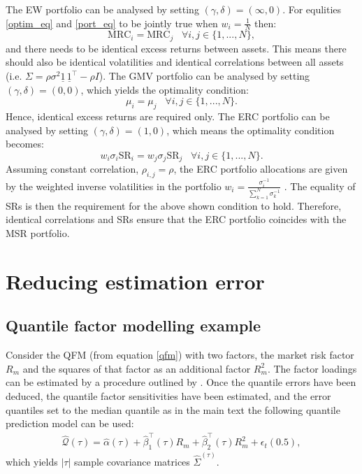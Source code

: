 \documentclass[a4paper,11pt,nocenter,bold,noupper,headcount]{mythesis}
\theoremstyle{plain}
\theoremstyle{definition}
\begin{document}
The EW portfolio can be analysed by setting $(\gamma, \delta) = (\infty, 0)$. For equlities \ref{optim_eq} and \ref{port_eq} to be jointly true when $w_i = \frac{1}{N}$ then: $$\text{MRC}_i = \text{MRC}_j \;\;\; \forall i, j \in \{1, ..., N \},$$
and there needs to be identical excess returns between assets. This means there should also be identical volatilities and identical correlations between all assets (i.e. $\Sigma = \rho\sigma^2 \underline{1} \,\underline{1}^\intercal - \rho I$). The GMV portfolio can be analysed by setting $(\gamma, \delta) = (0,0)$, which yields the optimality condition: $$\mu_i = \mu_j \;\;\; \forall i, j \in \{1, ..., N \}.$$
Hence, identical excess returns are required only. The ERC portfolio can be analysed by setting $(\gamma, \delta) = (1, 0)$, which  means the optimality condition becomes:
$$w_i \sigma_i \text{SR}_i = w_j \sigma_j \text{SR}_j \;\;\; \forall i, j \in \{1, ..., N \}.$$
Assuming constant correlation, $\rho_{i, j} = \rho$, the ERC portfolio allocations are given by the weighted inverse volatilities in the portfolio $w_i = \frac{\sigma^{-1}_i}{\sum_{k = 1}^N \sigma^{-1}_k}$ \citep{MRT10}. The equality of SRs is then the requirement for the above shown condition to hold. Therefore, identical correlations and SRs  ensure that the ERC portfolio coincides with the MSR portfolio.

\chapter{Reducing estimation error} 


\section{Quantile factor modelling example} \label{qfm_e}

Consider the QFM (from equation \ref{qfm}) with two factors, the market risk factor $R_m$ and the squares of that factor as an additional factor $R_m^2$. The factor loadings can be estimated by a procedure outlined by \cite{KB78}. Once the quantile errors have been deduced, the quantile factor sensitivities have been estimated, and the error quantiles set to the median quantile as in the main text the following quantile prediction model can be used:
\begin{align}
\hat{\mathcal{Q}}(\tau) = \hat{\alpha} (\tau) + \hat{\beta}_1^\intercal(\tau)R_m + \hat{\beta}_2^\intercal(\tau)R_m^2 + \epsilon_t(0.5),
\end{align}
which yields $|\tau|$ sample covariance matrices $\hat{\Sigma}^{(\tau)}$.
\end{document}
